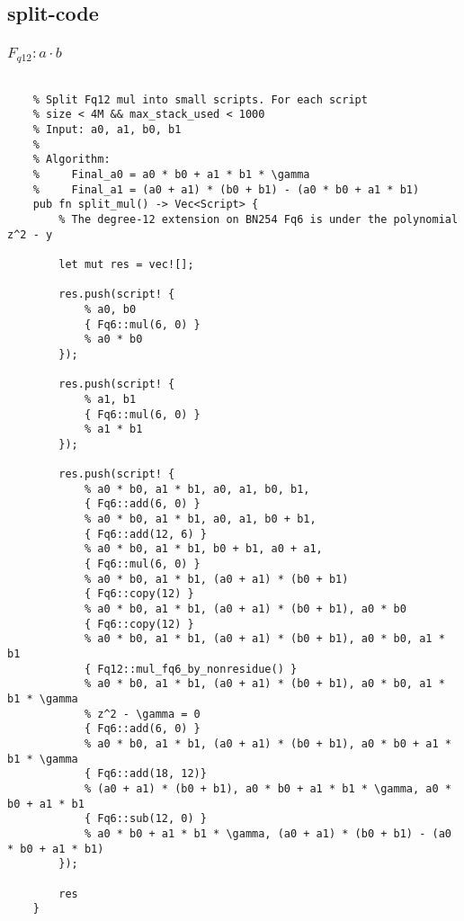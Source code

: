 \subsection{split-code}


\subsubsection{$F_{q12} : a \cdot b$}

\begin{lstlisting}

    % Split Fq12 mul into small scripts. For each script
    % size < 4M && max_stack_used < 1000
    % Input: a0, a1, b0, b1
    %
    % Algorithm:
    %     Final_a0 = a0 * b0 + a1 * b1 * \gamma
    %     Final_a1 = (a0 + a1) * (b0 + b1) - (a0 * b0 + a1 * b1)
    pub fn split_mul() -> Vec<Script> {
        % The degree-12 extension on BN254 Fq6 is under the polynomial z^2 - y

        let mut res = vec![];

        res.push(script! {
            % a0, b0
            { Fq6::mul(6, 0) }
            % a0 * b0
        });

        res.push(script! {
            % a1, b1
            { Fq6::mul(6, 0) }
            % a1 * b1
        });

        res.push(script! {
            % a0 * b0, a1 * b1, a0, a1, b0, b1,
            { Fq6::add(6, 0) }
            % a0 * b0, a1 * b1, a0, a1, b0 + b1,
            { Fq6::add(12, 6) }
            % a0 * b0, a1 * b1, b0 + b1, a0 + a1,
            { Fq6::mul(6, 0) }
            % a0 * b0, a1 * b1, (a0 + a1) * (b0 + b1)
            { Fq6::copy(12) }
            % a0 * b0, a1 * b1, (a0 + a1) * (b0 + b1), a0 * b0
            { Fq6::copy(12) }
            % a0 * b0, a1 * b1, (a0 + a1) * (b0 + b1), a0 * b0, a1 * b1
            { Fq12::mul_fq6_by_nonresidue() }
            % a0 * b0, a1 * b1, (a0 + a1) * (b0 + b1), a0 * b0, a1 * b1 * \gamma
            % z^2 - \gamma = 0
            { Fq6::add(6, 0) }
            % a0 * b0, a1 * b1, (a0 + a1) * (b0 + b1), a0 * b0 + a1 * b1 * \gamma
            { Fq6::add(18, 12)}
            % (a0 + a1) * (b0 + b1), a0 * b0 + a1 * b1 * \gamma, a0 * b0 + a1 * b1
            { Fq6::sub(12, 0) }
            % a0 * b0 + a1 * b1 * \gamma, (a0 + a1) * (b0 + b1) - (a0 * b0 + a1 * b1)
        });

        res
    }

\end{lstlisting}

